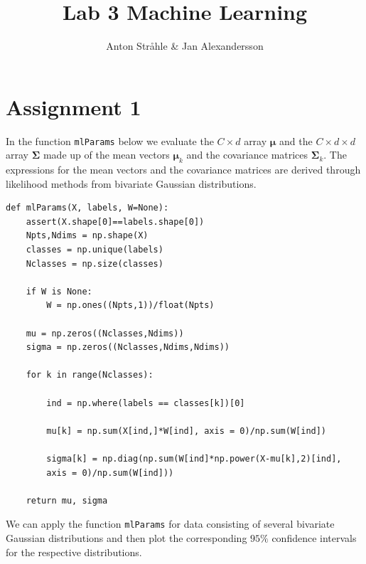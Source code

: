 \documentclass{article}
\begin{document}
\title{Lab 3 Machine Learning}
\author{Anton Stråhle \& Jan Alexandersson}
\maketitle

\section*{Assignment 1}

In the function \texttt{mlParams} below we evaluate the $C \times d$ array $\boldsymbol\mu$ and the $C \times d \times d$ array $\boldsymbol\Sigma$ made up of the mean vectors $\boldsymbol\mu_k$ and the covariance matrices $\boldsymbol\Sigma_k$. The expressions for the mean vectors and the covariance matrices are derived through likelihood methods from bivariate Gaussian distributions.

\begin{lstlisting}
def mlParams(X, labels, W=None):
    assert(X.shape[0]==labels.shape[0])
    Npts,Ndims = np.shape(X)
    classes = np.unique(labels)
    Nclasses = np.size(classes)

    if W is None:
        W = np.ones((Npts,1))/float(Npts)

    mu = np.zeros((Nclasses,Ndims))
    sigma = np.zeros((Nclasses,Ndims,Ndims))
    
    for k in range(Nclasses):
        
        ind = np.where(labels == classes[k])[0]
        
        mu[k] = np.sum(X[ind,]*W[ind], axis = 0)/np.sum(W[ind])
        
        sigma[k] = np.diag(np.sum(W[ind]*np.power(X-mu[k],2)[ind],
        axis = 0)/np.sum(W[ind]))   
                          
    return mu, sigma
\end{lstlisting}

We can apply the function \texttt{mlParams} for data consisting of several bivariate Gaussian distributions and then plot the corresponding $95\%$ confidence intervals for the respective distributions.
\end{document}
